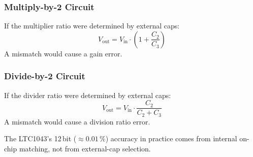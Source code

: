 \subsubsection{Multiply-by-2 Circuit}
If the multiplier ratio were determined by external caps:
\begin{equation}
	V_{\text{out}} = V_{\text{in}} \cdot \left(1 + \frac{C_2}{C_3}\right)
\end{equation}
A mismatch would cause a gain error.

\subsubsection{Divide-by-2 Circuit}
If the divider ratio were determined by external caps:
\begin{equation}
	V_{\text{out}} = V_{\text{in}} \cdot \frac{C_2}{C_2 + C_3}
\end{equation}
A mismatch would cause a division ratio error.

The LTC1043's 12\,bit ($\approx 0.01\,\%$) accuracy in practice comes from internal on-chip matching, not from external-cap selection.
